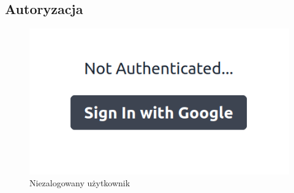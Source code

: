 \documentclass[a4paper, 12pt]{article}
\begin{document}
\subsection{Autoryzacja}
\begin{figure}[H]
	\centering
	\includegraphics*[scale=0.2]{img/google-auth.png}
	\caption{Niezalogowany użytkownik}
\end{figure}
\end{document}
